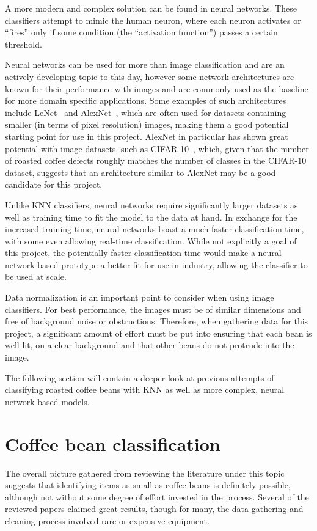 A more modern and complex solution can be found in neural networks. These classifiers
attempt to mimic the human neuron, where each neuron activates or ``fires'' only
if some condition (the ``activation function'') passes a certain threshold.

Neural networks can be used for more than image classification and are an
actively developing topic to this day, however some network architectures are known
for their performance with images and are commonly used as the baseline for more
domain specific applications. Some examples of such architectures include LeNet~\cite{leNetOverview}
and AlexNet~\cite{alexNetOverview}, which are often used for datasets containing
smaller (in terms of pixel resolution) images, making them a good potential
starting point for use in this project. AlexNet in particular has shown great potential
with image datasets, such as CIFAR-10~\cite{cifar10}, which, given that the
number of roasted coffee defects roughly matches the number of classes in the
CIFAR-10 dataset, suggests that an architecture similar to AlexNet may be a good
candidate for this project.

Unlike KNN classifiers, neural networks require significantly larger datasets as
well as training time to fit the model to the data at hand. In exchange for the increased
training time, neural networks boast a much faster classification time, with some
even allowing real-time classification. While not explicitly a goal of this
project, the potentially faster classification time would make a neural network-based
prototype a better fit for use in industry, allowing the classifier to be used
at scale.

Data normalization is an important point to consider when using image
classifiers. For best performance, the images must be of similar dimensions and
free of background noise or obstructions. Therefore, when gathering data for
this project, a significant amount of effort must be put into ensuring that each
bean is well-lit, on a clear background and that other beans do not protrude
into the image.

The following section will contain a deeper look at previous attempts of
classifying roasted coffee beans with KNN as well as more complex, neural network
based models.

\section{Coffee bean classification}
\label{sec:lit-review-coffee} The overall picture gathered from reviewing the literature
under this topic suggests that identifying items as small as coffee beans is definitely
possible, although not without some degree of effort invested in the process. Several
of the reviewed papers claimed great results, though for many, the data gathering
and cleaning process involved rare or expensive equipment.

